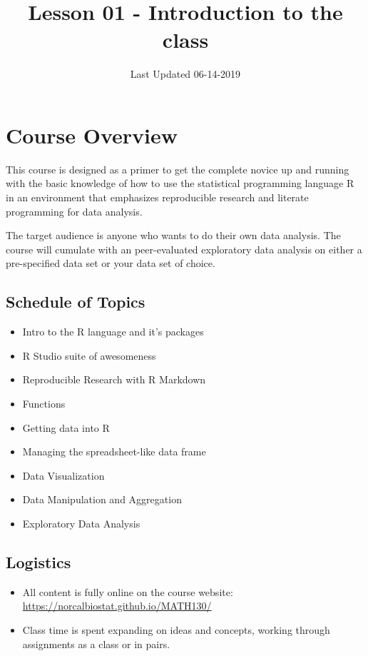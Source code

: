 \documentclass[]{article}
\title{Lesson 01 - Introduction to the class}
\author{}
\date{Last Updated 06-14-2019}
\providecommand{\tightlist}{%
  \setlength{\itemsep}{0pt}\setlength{\parskip}{0pt}}
\begin{document}
\maketitle

\hypertarget{course-overview}{%
\section{Course Overview}\label{course-overview}}

This course is designed as a primer to get the complete novice up and
running with the basic knowledge of how to use the statistical
programming language R in an environment that emphasizes reproducible
research and literate programming for data analysis.

The target audience is anyone who wants to do their own data analysis.
The course will cumulate with an peer-evaluated exploratory data
analysis on either a pre-specified data set or your data set of choice.

\hypertarget{schedule-of-topics}{%
\subsection{Schedule of Topics}\label{schedule-of-topics}}

\begin{itemize}
\tightlist
\item
  Intro to the R language and it's packages
\item
  R Studio suite of awesomeness
\item
  Reproducible Research with R Markdown
\item
  Functions
\item
  Getting data into R
\item
  Managing the spreadsheet-like data frame
\item
  Data Visualization
\item
  Data Manipulation and Aggregation
\item
  Exploratory Data Analysis
\end{itemize}

\hypertarget{logistics}{%
\subsection{Logistics}\label{logistics}}

\begin{itemize}
\tightlist
\item
  All content is fully online on the course website:
  \url{https://norcalbiostat.github.io/MATH130/}
\item
  Class time is spent expanding on ideas and concepts, working through
  assignments as a class or in pairs.
\end{itemize}
\end{document}
